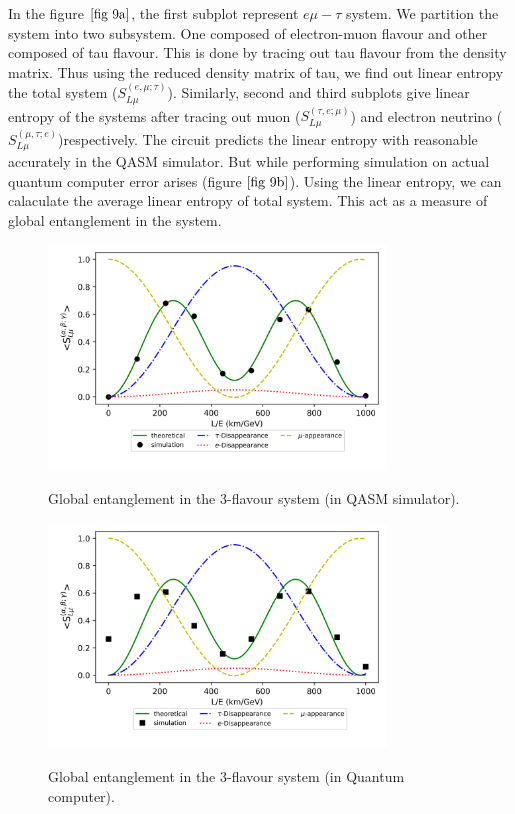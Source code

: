 \documentclass[12pt,a4paper]{report}
\begin{document}
In the figure $\ref{fig 9a}$, the first subplot represent $e\mu-\tau$ system. We partition the system into two subsystem. One composed of electron-muon flavour and other composed of tau flavour. This is done by tracing out tau flavour from the density matrix. Thus using the reduced density matrix of tau, we find out linear entropy the total system ($S^{(e,\mu;\tau)}_{L\mu}$). Similarly, second and third subplots give linear entropy of the systems after tracing out muon ($S^{(\tau,e;\mu)}_{L\mu}$) and electron neutrino ($S^{(\mu,\tau;e)}_{L\mu}$)respectively.
The circuit predicts the linear entropy with reasonable accurately in the QASM simulator. But while performing simulation on actual quantum computer error arises (figure $\ref{fig 9b}$). Using the linear entropy, we can calaculate the average linear entropy of total system. This act as a measure of global entanglement in the system. 
\begin{figure}[H]
	\graphicspath{ {./Images/} }
	\centering	
	{\includegraphics[width=0.8\textwidth]{fig_9a_1.png}}
	\caption{Global entanglement in the 3-flavour system (in QASM simulator).}
	\label{fig 9a_1}
\end{figure}
\begin{figure}[h]
	\graphicspath{ {./Images/} }
	\centering	
	{\includegraphics[width=0.8\textwidth]{fig_9a_2.png}}
	\caption{Global entanglement in the 3-flavour system (in Quantum computer).}
	\label{fig 9a_2}
\end{figure}
\end{document}
